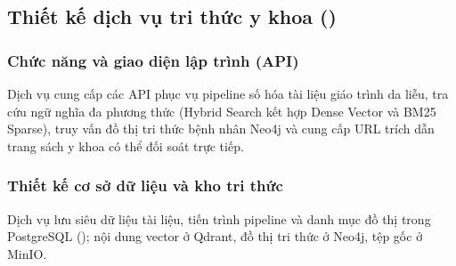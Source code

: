 \subsection{Thiết kế dịch vụ tri thức y khoa ()}

\subsubsection{Chức năng và giao diện lập trình (API)}
Dịch vụ cung cấp các API phục vụ pipeline số hóa tài liệu giáo trình da liễu, tra cứu ngữ nghĩa đa phương thức (Hybrid Search kết hợp Dense Vector và BM25 Sparse), truy vấn đồ thị tri thức bệnh nhân Neo4j và cung cấp URL trích dẫn trang sách y khoa có thể đối soát trực tiếp.

\subsubsection{Thiết kế cơ sở dữ liệu và kho tri thức}
Dịch vụ lưu siêu dữ liệu tài liệu, tiến trình pipeline và danh mục đồ thị trong PostgreSQL (); nội dung vector ở Qdrant, đồ thị tri thức ở Neo4j, tệp gốc ở MinIO.
